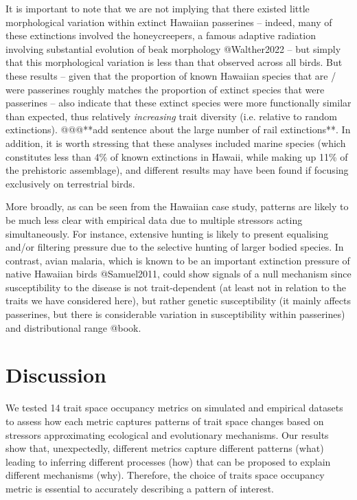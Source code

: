 \documentclass[12pt,letterpaper]{article}
\begin{document}
It is important to note that we are not implying that there existed little morphological variation within extinct Hawaiian passerines – indeed, many of these extinctions involved the honeycreepers, a famous adaptive radiation involving substantial evolution of beak morphology @Walther2022 – but simply that this morphological variation is less than that observed across all birds.
But these results – given that the proportion of known Hawaiian species that are / were passerines roughly matches the proportion of extinct species that were passerines –  also indicate that these extinct species were more functionally similar than expected, thus relatively \textit{increasing} trait diversity (i.e.
relative to random extinctions).
@@@**add sentence about the large number of rail extinctions**.
In addition, it is worth stressing that these analyses included marine species (which constitutes less than 4\% of  known extinctions in Hawaii, while making up 11\% of the prehistoric assemblage), and different results may have been found if focusing exclusively on terrestrial birds.


More broadly, as can be seen from the Hawaiian case study, patterns are likely to be much less clear with empirical data due to multiple stressors acting simultaneously.
For instance, extensive hunting is likely to present equalising and/or filtering pressure due to the selective hunting of larger bodied species.
In contrast, avian malaria, which is known to be an important extinction pressure of native Hawaiian birds @Samuel2011, could show signals of a null mechanism since susceptibility to the disease is not trait-dependent (at least not in relation to the traits we have considered here), but rather genetic susceptibility (it mainly affects passerines, but there is considerable variation in susceptibility within passerines) and distributional range @book.

\section{Discussion}

We tested 14 trait space occupancy metrics on simulated and empirical datasets to assess how each metric captures patterns of trait space changes based on stressors approximating ecological and evolutionary mechanisms.
Our results show that, unexpectedly, different metrics capture different patterns (what) leading to inferring different processes (how) that can be proposed to explain different mechanisms (why).
Therefore, the choice of traits space occupancy metric is essential to accurately describing a pattern of interest.
\end{document}
